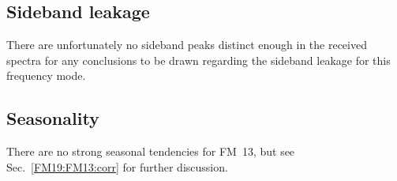 \subsection{Sideband leakage}
\label{FM13:sbl}
There are unfortunately no sideband peaks distinct enough in the received
spectra for any conclusions to be drawn regarding the sideband leakage for
this frequency mode.

\subsection{Seasonality}
\label{FM13:seasonality}
There are no strong seasonal tendencies for FM~13, but see
Sec.~\ref{FM19:FM13:corr} for further discussion.
